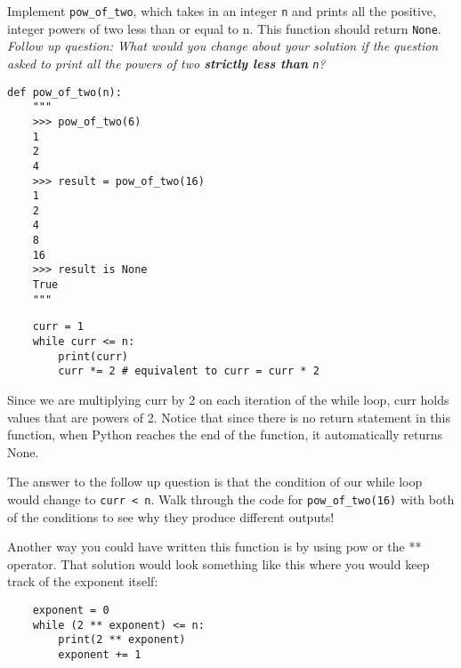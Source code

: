 \begin{blocksection}
\question Implement \lstinline$pow_of_two$, which takes in an integer \lstinline$n$ and
prints all the positive, integer powers of two less than or equal to n. This function should return \lstinline$None$.
\newline
\newline
\textit{Follow up question: What would you change about your solution if the question asked to print all the powers of two \textbf{strictly less than} \lstinline$n$?}
\begin{lstlisting}
def pow_of_two(n):
    """
    >>> pow_of_two(6)
    1
    2
    4
    >>> result = pow_of_two(16)
    1
    2
    4
    8
    16
    >>> result is None
    True
    """
\end{lstlisting}
\begin{solution}[2in]
\begin{lstlisting}
    curr = 1
    while curr <= n:
        print(curr)
        curr *= 2 # equivalent to curr = curr * 2
\end{lstlisting}
Since we are multiplying curr by 2 on each iteration of the while loop, curr holds values that are powers of 2.
Notice that since there is no return statement in this function, when Python reaches the end of the function, it automatically returns None.

The answer to the follow up question is that the condition of our while loop would change to \lstinline$curr < n$.
Walk through the code for \lstinline$pow_of_two(16)$ with both of the conditions to see why they produce different outputs!

Another way you could have written this function is by using pow or the ** operator. That solution would look something like this where you would keep track of the exponent itself:

\begin{lstlisting}
    exponent = 0
    while (2 ** exponent) <= n:
        print(2 ** exponent)
        exponent += 1
\end{lstlisting}
\end{solution}
\end{blocksection}